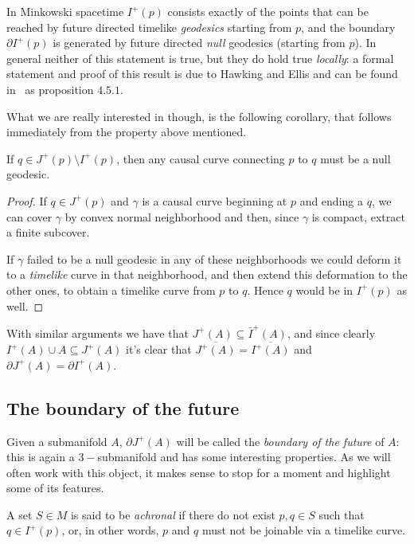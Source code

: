 In Minkowski spacetime \(I^+(p)\) consists exactly of the points that can be reached by future directed timelike \emph{geodesics} starting from \(p\), and the boundary \(\partial I^+(p)\) is generated by future directed \emph{null} geodesics (starting from \(p\)). In general neither of this statement is true, but they do hold true \emph{locally}: a formal statement and proof of this result is due to Hawking and Ellis and can be found in~\cite{hawking1973large} as proposition \(4.5.1\).

What we are really interested in though, is the following corollary, that follows immediately from the property above mentioned.
\begin{corollary}
	If \(q \in J^+(p) \setminus I^+(p)\), then any causal curve connecting \(p\) to \(q\) must be a null geodesic.
\end{corollary}

\begin{proof}
	If \( q \in J^+(p)\) and \(\gamma\) is a causal curve beginning at \(p\) and ending a \(q\), we can cover \(\gamma\) by convex normal neighborhood and then, since \(\gamma\) is compact, extract a finite subcover.
	
	If \(\gamma\) failed to be a null geodesic in any of these neighborhoods we could deform it to a \emph{timelike} curve in that neighborhood, and then extend this deformation to the other ones, to obtain a timelike curve from \(p\) to \(q\). Hence \(q\) would be in \(I^+(p)\) as well.
\end{proof}
With similar arguments we have that \(J^+(A) \subseteq \bar{I}^+(A)\), and since clearly \(I^+(A) \cup A \subseteq J^+(A)\) it's clear that \(\overline{J^+(A)} = \overline{I^+(A)}\) and \(\partial J^+(A) = \partial I^+(A)\).

\subsection{The boundary of the future}
Given a submanifold \(A\), \(\partial J^+(A)\) will be called the \emph{boundary of the future} of \(A\): this is again a \(3-\)submanifold and has some interesting properties. As we will often work with this object, it makes sense to stop for a moment and highlight some of its features.

\begin{definition}
	A set \(S\in M\) is said to be \emph{achronal} if there do not exist \(p, q \in S\) such that \(q\in I^+(p)\), or, in other words, \(p\) and \(q\) must not be joinable via a timelike curve. 
\end{definition}

